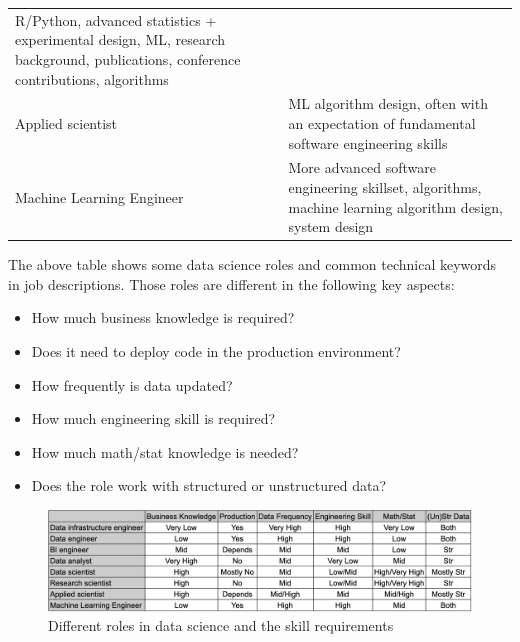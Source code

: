 \documentclass[12pt,]{krantz}
\providecommand{\tightlist}{%
  \setlength{\itemsep}{0pt}\setlength{\parskip}{0pt}}
\begin{document}
\begin{longtable}[]{@{}ll@{}}
\begin{minipage}[t]{0.47\columnwidth}
R/Python, advanced statistics + experimental design, ML, research background, publications, conference contributions, algorithms\strut
\end{minipage}\tabularnewline
\begin{minipage}[t]{0.47\columnwidth}\raggedright
Applied scientist\strut
\end{minipage} & \begin{minipage}[t]{0.47\columnwidth}\raggedright
ML algorithm design, often with an expectation of fundamental software engineering skills\strut
\end{minipage}\tabularnewline
\begin{minipage}[t]{0.47\columnwidth}\raggedright
Machine Learning Engineer\strut
\end{minipage} & \begin{minipage}[t]{0.47\columnwidth}\raggedright
More advanced software engineering skillset, algorithms, machine learning algorithm design, system design\strut
\end{minipage}\tabularnewline
\bottomrule
\end{longtable}

The above table shows some data science roles and common technical keywords in job descriptions. Those roles are different in the following key aspects:

\begin{itemize}
\tightlist
\item
  How much business knowledge is required?
\item
  Does it need to deploy code in the production environment?
\item
  How frequently is data updated?
\item
  How much engineering skill is required?
\item
  How much math/stat knowledge is needed?
\item
  Does the role work with structured or unstructured data?
\end{itemize}

\begin{figure}
\centering
\includegraphics{../course2020/slides/01Introduction/images/dsrole.png}
\caption{Different roles in data science and the skill requirements}
\end{figure}
\end{document}
